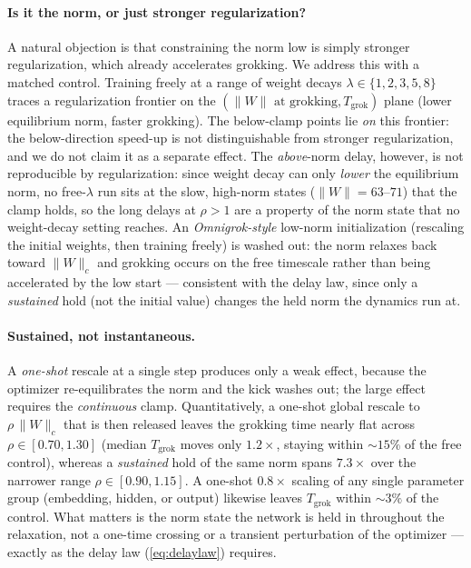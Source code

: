 \documentclass[10pt,twocolumn]{article}
\newcommand{\lam}{\lambda}
\newcommand{\Wc}{\|W\|_{c}}
\newcommand{\Tgrok}{T_{\mathrm{grok}}}
\begin{document}
\paragraph{Is it the norm, or just stronger regularization?}
A natural objection is that constraining the norm low is simply stronger regularization, which already
accelerates grokking. We address this with a matched control. Training freely at a range of weight decays
$\lam\in\{1,2,3,5,8\}$ traces a regularization frontier on the $(\|W\|\text{ at grokking},\Tgrok)$ plane
(lower equilibrium norm, faster grokking). The below-clamp points lie \emph{on} this frontier: the
below-direction speed-up is not distinguishable from stronger regularization, and we do not claim it as a
separate effect. The \emph{above}-norm delay, however, is not reproducible by regularization: since weight
decay can only \emph{lower} the equilibrium norm, no free-$\lam$ run sits at the slow, high-norm states
($\|W\|=63$--$71$) that the clamp holds, so the long delays at $\rho>1$ are a property of the norm state
that no weight-decay setting reaches. An \emph{Omnigrok-style} low-norm initialization (rescaling the
initial weights, then training freely) is washed out: the norm relaxes back toward $\Wc$ and grokking occurs
on the free timescale rather than being accelerated by the low start --- consistent with the delay law,
since only a \emph{sustained} hold (not the initial value) changes the held norm the dynamics run at.

\paragraph{Sustained, not instantaneous.}
A \emph{one-shot} rescale at a single step produces only a weak effect, because the optimizer
re-equilibrates the norm and the kick washes out; the large effect requires the \emph{continuous} clamp.
Quantitatively, a one-shot global rescale to $\rho\,\Wc$ that is then released leaves the grokking time
nearly flat across $\rho\in[0.70,1.30]$ (median $T_{\mathrm{grok}}$ moves only $1.2\times$, staying within
$\sim\!15\%$ of the free control), whereas a \emph{sustained} hold of the same norm spans $7.3\times$ over
the narrower range $\rho\in[0.90,1.15]$. A one-shot $0.8\times$ scaling of any single parameter group
(embedding, hidden, or output) likewise leaves $T_{\mathrm{grok}}$ within $\sim\!3\%$ of the control. What
matters is the norm state the network is held in throughout the relaxation, not a one-time crossing or a
transient perturbation of the optimizer --- exactly as the delay law (\ref{eq:delaylaw}) requires.
\end{document}
